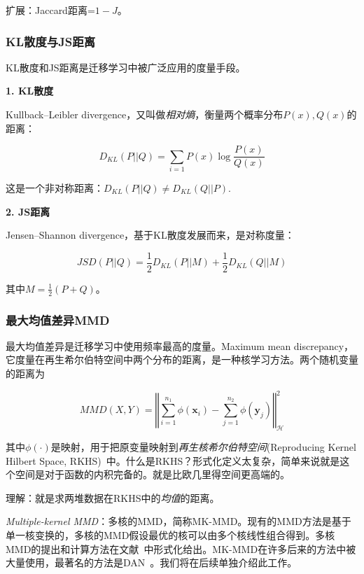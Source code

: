 扩展：Jaccard距离=$1-J$。

\subsubsection{KL散度与JS距离}

KL散度和JS距离是迁移学习中被广泛应用的度量手段。

\textbf{1. KL散度}

Kullback–Leibler divergence，又叫做\textit{相对熵}，衡量两个概率分布$P(x),Q(x)$的距离：

\begin{equation}
	\label{eq-dist-kl}
	D_{KL}(P||Q)=\sum_{i=1} P(x) \log \frac{P(x)}{Q(x)}
\end{equation}

这是一个非对称距离：$D_{KL}(P||Q) \ne D_{KL}(Q||P)$.

\textbf{2. JS距离}

Jensen–Shannon divergence，基于KL散度发展而来，是对称度量：

\begin{equation}
	\label{eq-dist-js}
	JSD(P||Q)= \frac{1}{2} D_{KL}(P||M) + \frac{1}{2} D_{KL}(Q||M)
\end{equation}

其中$M=\frac{1}{2}(P+Q)$。

\subsubsection{最大均值差异MMD}

最大均值差异是迁移学习中使用频率最高的度量。Maximum mean discrepancy，它度量在再生希尔伯特空间中两个分布的距离，是一种核学习方法。两个随机变量的距离为

\begin{equation}
	\label{eq-dist-mmd}
	MMD(X,Y)=\left \Vert \sum_{i=1}^{n_1}\phi(\mathbf{x}_i)- \sum_{j=1}^{n_2}\phi(\mathbf{y}_j) \right \Vert^2_\mathcal{H}
\end{equation}

其中$\phi(\cdot)$是映射，用于把原变量映射到\textit{再生核希尔伯特空间}(Reproducing Kernel Hilbert Space, RKHS)~\cite{borgwardt2006integrating}中。什么是RKHS？形式化定义太复杂，简单来说就是这个空间是对于函数的内积完备的。就是比欧几里得空间更高端的。

理解：就是求两堆数据在RKHS中的\textit{均值}的距离。

\textit{Multiple-kernel MMD}：多核的MMD，简称MK-MMD。现有的MMD方法是基于单一核变换的，多核的MMD假设最优的核可以由多个核线性组合得到。多核MMD的提出和计算方法在文献~\cite{gretton2012optimal}中形式化给出。MK-MMD在许多后来的方法中被大量使用，最著名的方法是DAN~\cite{long2015learning}。我们将在后续单独介绍此工作。

